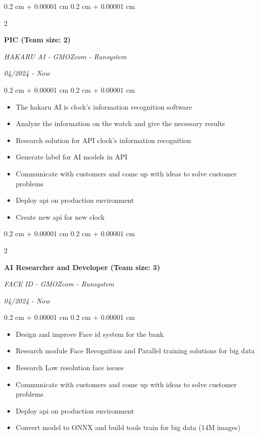 \documentclass[10pt, letterpaper]{article}
\newenvironment{highlights}{
    \begin{itemize}[
        topsep=0.10 cm,
        parsep=0.10 cm,
        partopsep=0pt,
        itemsep=0pt,
        leftmargin=0.4 cm + 10pt
    ]
}{
    \end{itemize}
} %
\newenvironment{onecolentry}{
    \begin{adjustwidth}{
        0.2 cm + 0.00001 cm
    }{
        0.2 cm + 0.00001 cm
    }
}{
    \end{adjustwidth}
} %
\newenvironment{twocolentry}[2][]{
    \onecolentry
    \def\secondColumn{#2}
    \setcolumnwidth{\fill, 4.5 cm}
    \begin{paracol}{2}
}{
    \switchcolumn \raggedleft \secondColumn
    \end{paracol}
    \endonecolentry
} %
\begin{document}
    \vspace{0.2 cm}

    \begin{twocolentry}{
        \textit{04/2024 - Now}
    }
        \textbf{PIC (Team size: 2)}
        
        \textit{HAKARU AI - GMOZcom - Runsystem}
    \end{twocolentry}

    \begin{onecolentry}
        \begin{highlights}
            \item The hakaru AI is clock's information recognition software
            \item Analyze the information on the watch and give the necessary results
            \item Research solution for API clock's information recognition
            \item Generate label for AI models in API
            \item Communicate with customers and come up with ideas to solve customer problems
            \item Deploy api on production environment
            \item Create new api for new clock
        \end{highlights}
    \end{onecolentry}

    \vspace{0.2 cm}

    \begin{twocolentry}{
        \textit{04/2024 - Now}
    }
        \textbf{AI Researcher and Developer (Team size: 3)}
        
        \textit{FACE ID - GMOZcom - Runsystem}
    \end{twocolentry}

    \begin{onecolentry}
        \begin{highlights}
            \item Design and improve Face id system for the bank
            \item Research module Face Recognition and Parallel training solutions for big data
            \item Research Low resolution face issues
            \item Communicate with customers and come up with ideas to solve customer problems
            \item Deploy api on production environment
            \item Convert model to ONNX and build tools train for big data (14M images)
        \end{highlights}
    \end{onecolentry}
\end{document}
